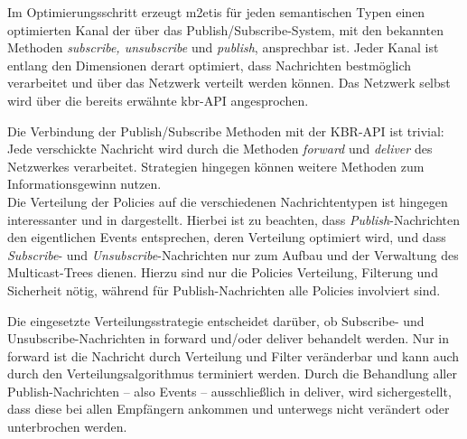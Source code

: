 Im Optimierungsschritt erzeugt \ac{m2etis} für jeden semantischen Typen einen optimierten Kanal der über das Publish/Subscribe-System, mit den bekannten Methoden \emph{subscribe, unsubscribe} und \emph{publish}, ansprechbar ist. Jeder Kanal ist entlang den Dimensionen derart optimiert, dass Nachrichten bestmöglich verarbeitet und über das Netzwerk verteilt werden können. Das Netzwerk selbst wird über die bereits erwähnte \ac{kbr}-API angesprochen. 

Die Verbindung der Publish/Subscribe Methoden mit der KBR-API ist trivial: Jede verschickte Nachricht wird durch die Methoden \emph{forward} und \emph{deliver} des Netzwerkes verarbeitet. Strategien hingegen können weitere Methoden zum Informationsgewinn nutzen.\\
Die Verteilung der Policies auf die verschiedenen Nachrichtentypen ist hingegen interessanter und in  dargestellt. Hierbei ist zu beachten, dass \emph{Publish}-Nachrichten den eigentlichen Events entsprechen, deren Verteilung optimiert wird, und dass \emph{Subscribe}- und \emph{Unsubscribe}-Nachrichten nur zum Aufbau und der Verwaltung des Multicast-Trees dienen. Hierzu sind nur die Policies Verteilung, Filterung und Sicherheit nötig, während für Publish-Nachrichten alle Policies involviert sind.

\begin{table}[!h]
\caption{Verbindungsmatrix}
\label{tab:verbindungsmatrix}
\end{table}

Die eingesetzte Verteilungsstrategie entscheidet darüber, ob Subscribe- und Unsubscribe-Nachrichten in forward und/oder deliver behandelt werden. Nur in forward ist die Nachricht durch Verteilung und Filter veränderbar und kann auch durch den Verteilungsalgorithmus terminiert werden. Durch die Behandlung aller Publish-Nachrichten -- also Events -- ausschließlich in deliver, wird sichergestellt, dass diese bei allen Empfängern ankommen und unterwegs nicht verändert oder unterbrochen werden.

